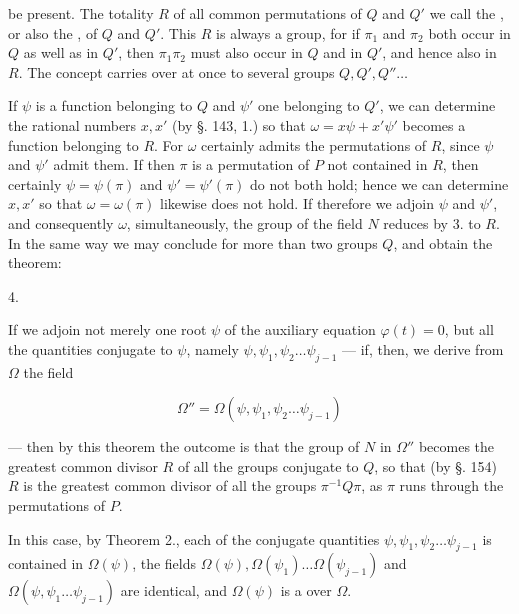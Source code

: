 be present. The totality $R$ of all common permutations of $Q$
and $Q'$ we call the ,
or also the , of $Q$ and $Q'$. This $R$ is always a
group, for if $\pi_1$ and $\pi_2$ both occur in $Q$ as well as in $Q'$,
then $\pi_1 \pi_2$ must also occur in $Q$ and in $Q'$, and hence also in $R$.
The concept carries over at once to several
groups $Q, Q', Q'' \ldots$

If $\psi$ is a function belonging to $Q$ and $\psi'$ one belonging to $Q'$,
we can determine the rational numbers $x, x'$ (by §. 143, 1.)
so that $\omega = x\psi + x'\psi'$ becomes a function belonging to $R$.
For $\omega$ certainly admits the permutations of $R$, since
$\psi$ and $\psi'$ admit them. If then $\pi$ is a permutation of $P$ not
contained in $R$, then certainly $\psi = \psi(\pi)$ and
$\psi' = \psi'(\pi)$ do not both hold; hence we can determine $x, x'$ so that
$\omega = \omega(\pi)$ likewise does not hold. If therefore we adjoin $\psi$ and $\psi'$,
and consequently $\omega$, simultaneously, the group of the field $N$
reduces by 3. to $R$. In the same way we may conclude for more than two groups $Q$,
and obtain the theorem:

4. 

If we adjoin not merely one root $\psi$ of the auxiliary equation
$\varphi(t) = 0$, but all the quantities conjugate to $\psi$,
namely $\psi, \psi_1, \psi_2 \ldots \psi_{j-1}$ — if, then, we derive from $\Omega$ the field

\[
\Omega'' = \Omega(\psi, \psi_1, \psi_2 \ldots \psi_{j-1})
\]

— then by this theorem the outcome is that the
group of $N$ in $\Omega''$ becomes the greatest common divisor $R$
of all the groups conjugate to $Q$, so that (by §. 154)
$R$ is the greatest common divisor of all the groups $\pi^{-1}Q\pi$,
as $\pi$ runs through the permutations of $P$.

 In this
case, by Theorem 2., each of the conjugate quantities
$\psi, \psi_1, \psi_2 \ldots \psi_{j-1}$ is contained in $\Omega(\psi)$, the fields
$\Omega(\psi), \Omega(\psi_1) \ldots \Omega(\psi_{j-1})$ and $\Omega(\psi, \psi_1 \ldots \psi_{j-1})$ are identical,
and $\Omega(\psi)$ is a  over $\Omega$.
